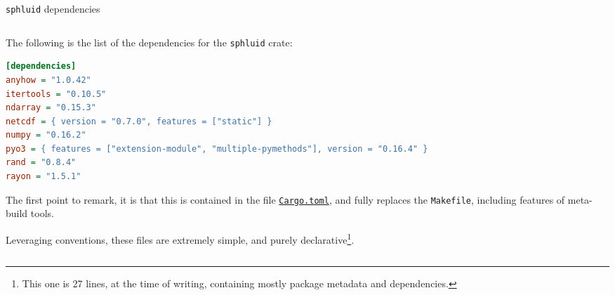 \documentclass[9pt]{beamer}
\newcommand{\sphluid}{\texttt{sphluid}\xspace}
\begin{document}
\begin{frame}[fragile]{\sphluid dependencies}
    \begin{columns}
        \begin{column}{0.5\textwidth}
            \vspace*{15pt}

            The following is the list of the dependencies for the \sphluid
            crate:
            \begin{lstlisting}[language=ini, style=mystyle, breaklines=true]
[dependencies]
anyhow = "1.0.42"
itertools = "0.10.5"
ndarray = "0.15.3"
netcdf = { version = "0.7.0", features = ["static"] }
numpy = "0.16.2"
pyo3 = { features = ["extension-module", "multiple-pymethods"], version = "0.16.4" }
rand = "0.8.4"
rayon = "1.5.1"\end{lstlisting}
        \vspace*{10pt}

            The first point to remark, it is that this is contained in the file
            \href{https://github.com/AleCandido/sphluid/blob/main/sphluid/Cargo.toml}{\texttt{Cargo.toml}},
            and fully replaces the \texttt{Makefile}, including features of
            meta-build tools.

            Leveraging conventions, these files are extremely simple, and
            purely declarative\footnote{
                This one is 27 lines, at the time of writing, containing mostly
                package metadata and dependencies.
            }.


\end{column}
\end{columns}
\end{frame}
\end{document}

